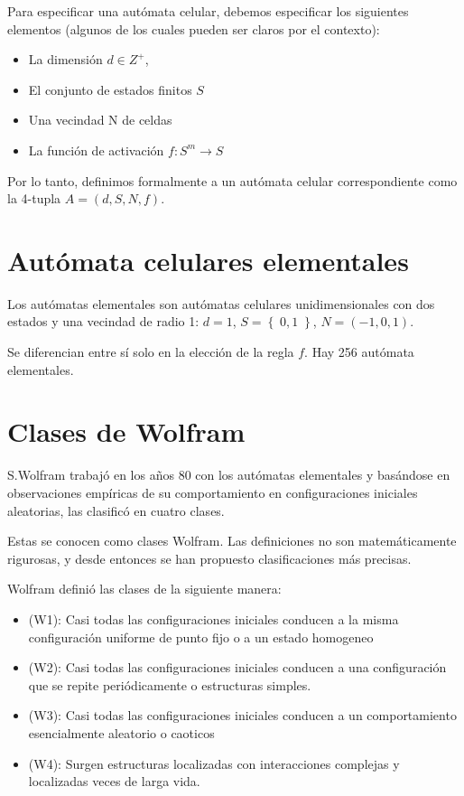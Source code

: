 \documentclass[12pt, fleqn]{report}                             %
\theoremstyle{break}                                            %
\newcommand{\Set}[1]            {\left\{ \; #1 \; \right\}}     %
\begin{document}
      Para especificar una autómata celular, debemos especificar los siguientes 
      elementos (algunos de los cuales pueden ser claros por el contexto):
      \begin{itemize}
        \item La dimensión $d \in Z^+$,
        \item El conjunto de estados finitos $S$
        \item Una vecindad N de celdas
        \item La función de activación $f: S^m \to S$
      \end{itemize}

      Por lo tanto, definimos formalmente a un autómata celular 
      correspondiente como la 4-tupla $A = (d, S, N, f)$.

      \section{Autómata celulares elementales}

      Los autómatas elementales son autómatas celulares unidimensionales con dos estados y una
      vecindad de radio 1: $d = 1$, $S = \Set{0, 1}$, $N = (-1, 0, 1)$.
      
      Se diferencian entre sí solo en la elección de la regla $f$. 
      Hay 256 autómata elementales.

      \section{Clases de Wolfram}

      S.Wolfram trabajó en los años 80 con los autómatas elementales y basándose en observaciones empíricas 
      de su comportamiento en configuraciones iniciales aleatorias, las clasificó en cuatro clases.

      Estas se conocen como clases Wolfram. 
      Las definiciones no son matemáticamente rigurosas, y desde entonces se han propuesto 
      clasificaciones más precisas.

      Wolfram definió las clases de la siguiente manera:
      \begin{itemize}
        \item (W1): Casi todas las configuraciones iniciales conducen a la misma configuración uniforme de punto fijo o a un 
        estado homogeneo
        \item (W2): Casi todas las configuraciones iniciales conducen a una configuración que se repite periódicamente o estructuras
        simples.
        \item (W3): Casi todas las configuraciones iniciales conducen a un comportamiento esencialmente aleatorio o caoticos
        \item (W4): Surgen estructuras localizadas con interacciones complejas y localizadas veces de larga vida. 
      \end{itemize}
\end{document}
